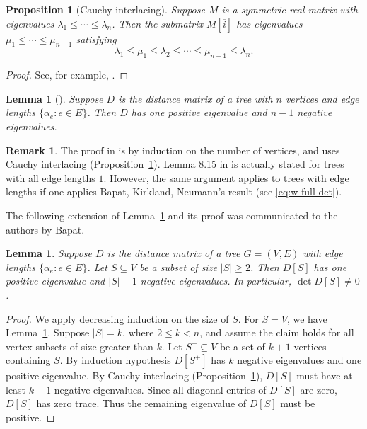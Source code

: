 \documentclass[12pt]{amsart}
\newtheorem{prop}[thm]{Proposition}
\newtheorem{lem}[thm]{Lemma}
\theoremstyle{definition}
\newtheorem{rmk}[thm]{Remark}
\newcommand{\Da}{{D}}
\begin{document}
\begin{prop}[Cauchy interlacing]
\label{prop:cauchy-interlacing}
Suppose $M$ is a symmetric real matrix  with eigenvalues $\lambda_1 \leq \cdots \leq \lambda_n$. 
Then the submatrix $M[\overline{i}]$ has eigenvalues $\mu_1 \leq \cdots \leq \mu_{n-1}$ satisfying
\[
	\lambda_1 \leq \mu_1 \leq \lambda_2 \leq \cdots \leq \mu_{n-1} \leq \lambda_n.
\]
\end{prop}
\begin{proof}
See, for example, \cite[Theorem 4.3.17]{horn-johnson}.
\end{proof}

\begin{lem}[{\cite[Lemma 8.15]{bapat-book}}]
\label{lem:dist-signature}
Suppose $\Da$ is the distance matrix of a tree with $n$ vertices and edge lengths $\{\alpha_e \colon e \in E\}$. 
Then $\Da$ has one positive eigenvalue and $n - 1$ negative eigenvalues.
\end{lem}
\begin{rmk}
The proof in \cite{bapat-book} is by induction on the number of vertices, and uses Cauchy interlacing (Proposition~\ref{prop:cauchy-interlacing}). Lemma 8.15 in \cite{bapat-book} is actually stated for trees with all edge lengths $1$. However, the same argument applies to trees with edge lengths if one applies Bapat, Kirkland, Neumann's result \cite[Corollary 2.5]{bapat-kirkland-neumann} (see \eqref{eq:w-full-det}).
\end{rmk}
The following extension of Lemma~\ref{lem:dist-signature} and its proof was communicated to the authors by Bapat.
\begin{lem}
\label{lem:distance-sub-nonsingular}
Suppose $\Da$ is the distance matrix of a tree $G = (V,E)$ with edge lengths $\{\alpha_e \colon e \in E\}$. Let $S \subseteq V$ be a subset of size $|S| \geq 2$. 
Then $\Da[S]$ has one positive eigenvalue and $|S| - 1$ negative eigenvalues.
In particular, $\det \Da[S] \neq 0$.
\end{lem}
\begin{proof}
We apply decreasing induction on the size of $S$. 
For $S = V$, we have Lemma~\ref{lem:dist-signature}.
Suppose $|S| = k$, where $2 \leq k < n$, and assume the claim holds for all vertex subsets of size greater than $k$.
Let $S^+ \subseteq V$ be a set of $k + 1$ vertices containing $S$.
By induction hypothesis $D[S^+]$ has $k$ negative eigenvalues and one positive eigenvalue.
By Cauchy interlacing (Proposition~\ref{prop:cauchy-interlacing}), $D[S]$ must have at least $k - 1$ negative eigenvalues. 
Since all diagonal entries of $D[S]$ are zero, $D[S]$ has zero trace.  Thus the remaining eigenvalue of $D[S]$ must be positive.
\end{proof}
\end{document}
